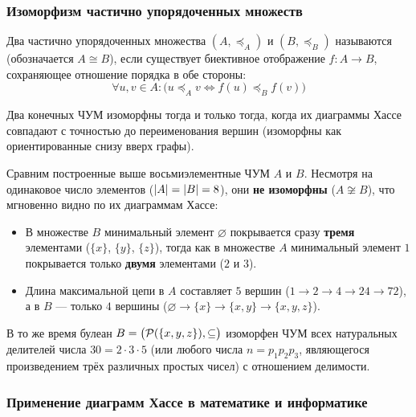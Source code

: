 \subsubsection{Изоморфизм частично упорядоченных множеств}

\begin{definition}
    Два частично упорядоченных множества $(A, \preceq_A)$ и $(B, \preceq_B)$ 
    называются  (обозначается $A \cong B$), если 
    существует биективное отображение $f: A \to B$, сохраняющее отношение 
    порядка в обе стороны:
    \begin{equation} \label{eq:poset_iso}
        \forall u, v \in A : 
        \bigl(u \preceq_A v \iff f(u) \preceq_B f(v)\bigr) \tag{12}
    \end{equation}
\end{definition}

\begin{remark}
    Два конечных ЧУМ изоморфны тогда и только тогда, когда их диаграммы 
    Хассе совпадают с точностью до переименования вершин (изоморфны как 
    ориентированные снизу вверх графы).

    Сравним построенные выше восьмиэлементные ЧУМ $A$ и $B$. Несмотря на 
    одинаковое число элементов ($\left| A \right| = \left| B \right| = 8$), они 
    \textbf{не изоморфны} ($A \not\cong B$), что мгновенно видно по их 
    диаграммам Хассе:
    \begin{itemize}
        \item В множестве $B$ минимальный элемент $\varnothing$ покрывается 
        сразу \textbf{тремя} элементами ($\{x\}$, $\{y\}$, $\{z\}$), тогда 
        как в множестве $A$ минимальный элемент $1$ покрывается только 
        \textbf{двумя} элементами ($2$ и $3$).
        \item Длина максимальной цепи в $A$ составляет $5$ вершин 
        ($1 \to 2 \to 4 \to 24 \to 72$), а в $B$ --- только $4$ вершины 
        ($\varnothing \to \{x\} \to \{x, y\} \to \{x, y, z\}$).
    \end{itemize}
    В то же время булеан $B = \bigl(\mathcal{P}(\{x, y, z\}), \subseteq\bigr)$ 
    изоморфен ЧУМ всех натуральных делителей числа $30 = 2 \cdot 3 \cdot 5$ 
    (или любого числа $n = p_1 p_2 p_3$, являющегося произведением трёх 
    различных простых чисел) с отношением делимости.
\end{remark}

\subsubsection{Применение диаграмм Хассе в математике и информатике}

